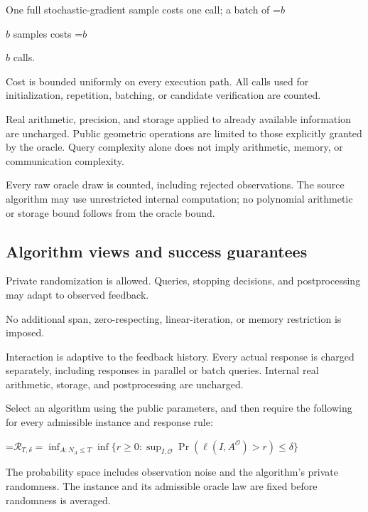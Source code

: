 \documentclass[10pt,a4paper]{article}
\newcommand{\AtlasMath}[1]{\par\begingroup\centering\setbox0=\hbox{$\displaystyle #1$}\ifdim\wd0>1.4\linewidth\typeout{ATLAS WIDE FORMULA: \the\wd0}\fi\ifdim\wd0>\linewidth\resizebox{\linewidth}{!}{\box0}\else\box0\fi\par\endgroup}
\newcommand{\AtlasInlineMath}[1]{\begingroup\setbox0=\hbox{$#1$}\ifdim\wd0>.4\linewidth\endgroup\AtlasMath{#1}\else\endgroup$#1$\fi}
\begin{document}
One full stochastic-gradient sample costs one call; a batch of \AtlasInlineMath{b} samples costs \AtlasInlineMath{b} calls.



Cost is bounded uniformly on every execution path. All calls used for initialization, repetition, batching, or candidate verification are counted.



Real arithmetic, precision, and storage applied to already available information are uncharged. Public geometric operations are limited to those explicitly granted by the oracle. Query complexity alone does not imply arithmetic, memory, or communication complexity.



Every raw oracle draw is counted, including rejected observations. The source algorithm may use unrestricted internal computation; no polynomial arithmetic or storage bound follows from the oracle bound.



\subsection{Algorithm views and success guarantees}


Private randomization is allowed. Queries, stopping decisions, and postprocessing may adapt to observed feedback.



No additional span, zero-respecting, linear-iteration, or memory restriction is imposed.



Interaction is adaptive to the feedback history. Every actual response is charged separately, including responses in parallel or batch queries. Internal real arithmetic, storage, and postprocessing are uncharged.



Select an algorithm using the public parameters, and then require the following for every admissible instance and response rule:




\AtlasMath{\mathcal{R}_{T,\delta}=\inf_{A:N_A\le T}\inf\{r\ge0:\sup_{I,\mathcal{O}}\Pr(\ell(I,A^{\mathcal{O}})>r)\le\delta\}}




The probability space includes observation noise and the algorithm's private randomness. The instance and its admissible oracle law are fixed before randomness is averaged.
\end{document}
